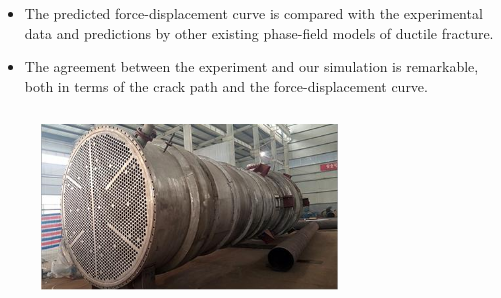 \begin{frame}
\begin{columns}[T]
\begin{column}{0.4\textwidth}
\begin{itemize}
        \item The predicted \textcolor{peggyblue}{force-displacement curve} is compared with the experimental data and predictions by other existing phase-field models of ductile fracture.
        \item The agreement between the experiment and our simulation is \textcolor{peggyblue}{remarkable}, both in terms of the crack path and the force-displacement curve.
      \end{itemize}
    \end{column}
  \end{columns}
\end{frame}

\begin{frame}
  \vspace{-1.5em}
  \begin{columns}[T]
    \begin{column}{0.5\textwidth}
      \begin{figure}
        \centering
        \includegraphics[width=0.7\textwidth]{Chapter345/figures/HTHX}
      \end{figure}
      

\end{column}
\end{columns}
\end{frame}
